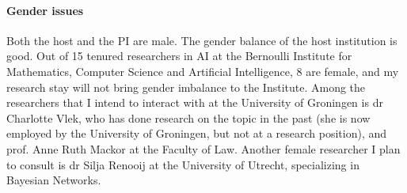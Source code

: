 \documentclass[11pt, a4paper]{article}
\begin{document}
\vspace{-2mm}

\paragraph{Gender issues} Both the host and the PI are male. The gender balance of the host institution is good. Out of 15 tenured researchers in AI  at the Bernoulli Institute for Mathematics, Computer Science and Artificial Intelligence, 8 are female, and my research stay will not bring gender imbalance to the Institute. Among the  researchers that I intend to interact with at the University of Groningen  is dr Charlotte Vlek, who has done research on the topic in the past (she is now employed by the University of Groningen, but not at a research position), and prof. Anne Ruth Mackor at the Faculty of Law. Another female researcher I plan to consult is dr  Silja Renooij at the University of Utrecht, specializing in Bayesian Networks. 






%
%






















\end{document}
